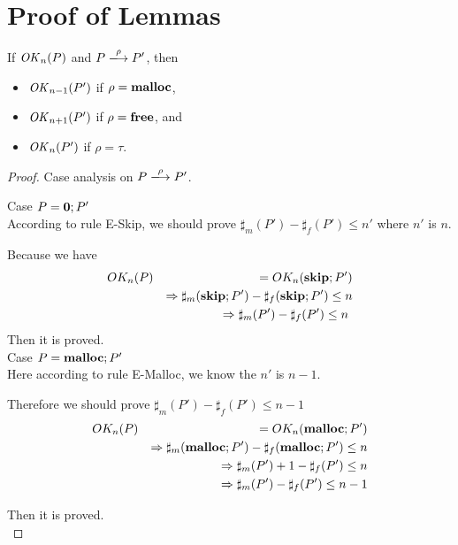 \section{Proof of Lemmas}

\begin{lemma}
\label{lem:okPreserved}
If \(\mathit{OK}_n(P)\) and \(P \xlongrightarrow{\rho} P'\), then
\begin{itemize}
\item \(\mathit{OK}_{n-1}(P')\) if \(\rho = \mathbf{malloc}\),
\item \(\mathit{OK}_{n+1}(P')\) if \(\rho = \mathbf{free}\), and
\item \(\mathit{OK}_n(P')\) if \(\rho = \tau\).
\end{itemize}
\end{lemma}
\begin{proof}

Case analysis on \(P \xlongrightarrow{\rho} P'\).


\noindent Case $P = \mathbf{0};P'$\\

According to rule E-Skip, we should prove
$\sharp_{m}(P')-\sharp_{f}(P') \le n'$ where $n'$ is $n$.

Because we have
\begin{eqnarray*}
  OK_{n}(P)  & & =  OK_{n}(\mathbf{skip};P')\\
  & & \Rightarrow \sharp_{m}(\mathbf{skip};P') - \sharp_{f}(\mathbf{skip};P') \le n \\
  & & \Rightarrow \sharp_{m}(P') - \sharp_{f}(P') \le n \
\end{eqnarray*}
Then it is proved. \\

\noindent Case $P = \mathbf{malloc};P'$ \\

Here according to rule E-Malloc, we know the $n'$ is $n-1$.

Therefore we should prove $\sharp_{m}(P') - \sharp_{f}(P') \le n-1$
\begin{eqnarray*}
  OK_{n}(P)&& =  OK_{n}(\mathbf{malloc};P')\\
  &&\Rightarrow \sharp_{m}(\mathbf{malloc};P') - \sharp_{f}(\mathbf{malloc};P') \le n \\
  &&\Rightarrow  \sharp_{m}(P') + 1 - \sharp_{f}(P') \le n\\
  &&\Rightarrow  \sharp_{m}(P')  - \sharp_{f}(P') \le n-1\\
\end{eqnarray*}

Then it is proved.\\


\end{proof}

